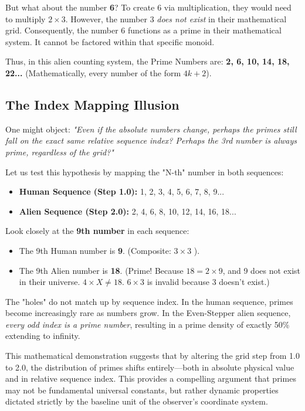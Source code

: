 \documentclass[12pt]{article}
\begin{document}
But what about the number \textbf{6}? To create 6 via multiplication, they would need to multiply $2 \times 3$. However, the number 3 \textit{does not exist} in their mathematical grid. Consequently, the number 6 functions as a prime in their mathematical system. It cannot be factored within that specific monoid.

Thus, in this alien counting system, the Prime Numbers are: \textbf{2, 6, 10, 14, 18, 22...} (Mathematically, every number of the form $4k+2$). 

\subsection{The Index Mapping Illusion}
One might object: \textit{"Even if the absolute numbers change, perhaps the primes still fall on the exact same relative sequence index? Perhaps the 3rd number is always prime, regardless of the grid?"}

Let us test this hypothesis by mapping the "N-th" number in both sequences:
\begin{itemize}
    \item \textbf{Human Sequence (Step 1.0):} 1, 2, 3, 4, 5, 6, 7, 8, 9...
    \item \textbf{Alien Sequence (Step 2.0):} 2, 4, 6, 8, 10, 12, 14, 16, 18...
\end{itemize}

Look closely at the \textbf{9th number} in each sequence:
\begin{itemize}
    \item The 9th Human number is \textbf{9}. (Composite:  $3 \times 3$ ).
    \item The 9th Alien number is \textbf{18}. (Prime! Because $18 = 2 \times 9$, and 9 does not exist in their universe. $4 \times X \neq 18$. $6 \times 3$ is invalid because 3 doesn't exist.)
\end{itemize}

The "holes" do not match up by sequence index. In the human sequence, primes become increasingly rare as numbers grow. In the Even-Stepper alien sequence, \textit{every odd index is a prime number}, resulting in a prime density of exactly 50\% extending to infinity.

This mathematical demonstration suggests that by altering the grid step from 1.0 to 2.0, the distribution of primes shifts entirely---both in absolute physical value and in relative sequence index. This provides a compelling argument that primes may not be fundamental universal constants, but rather dynamic properties dictated strictly by the baseline unit of the observer's coordinate system.
\end{document}
